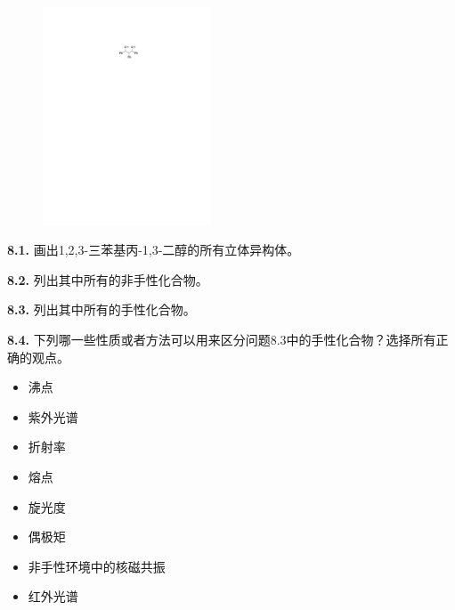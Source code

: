 \begin{figure}[h]
	\centering
	\includegraphics[width=5cm]{./pic/t8-1.pdf}
\end{figure}

\noindent\textbf{8.1.} 画出1,2,3-三苯基丙-1,3-二醇的所有立体异构体。

\noindent\textbf{8.2.} 列出其中所有的非手性化合物。

\noindent\textbf{8.3.} 列出其中所有的手性化合物。

\noindent\textbf{8.4.} 下列哪一些性质或者方法可以用来区分问题8.3中的手性化合物？选择所有正确的观点。

\renewcommand{\labelitemi}{$\square$}
\begin{itemize}
\item 沸点
\item 紫外光谱
\item 折射率
\item 熔点
\item 旋光度
\item 偶极矩
\item 非手性环境中的核磁共振
\item 红外光谱
\end{itemize}
\renewcommand{\labelitemi}{$\bullet$}
